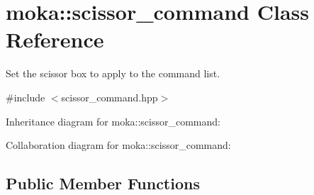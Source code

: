 \hypertarget{classmoka_1_1scissor__command}{}\section{moka\+::scissor\+\_\+command Class Reference}
\label{classmoka_1_1scissor__command}


Set the scissor box to apply to the command list.  




{\ttfamily \#include $<$scissor\+\_\+command.\+hpp$>$}



Inheritance diagram for moka\+::scissor\+\_\+command\+:


Collaboration diagram for moka\+::scissor\+\_\+command\+:
\subsection*{Public Member Functions}
